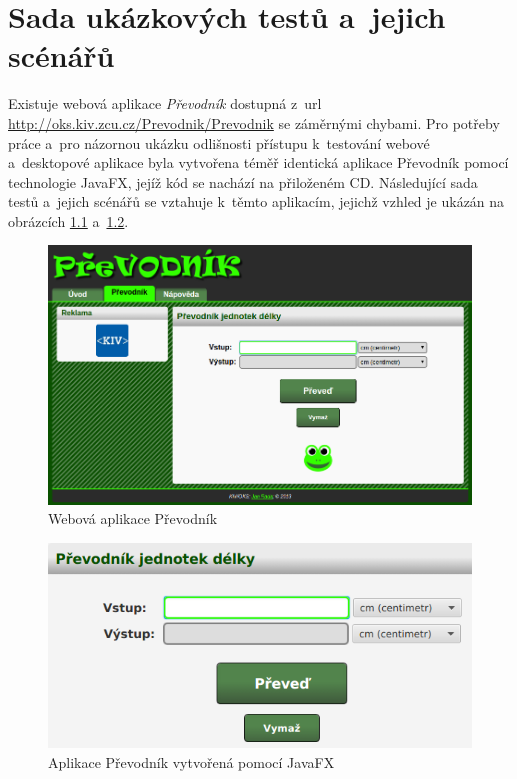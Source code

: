 \chapter{Sada ukázkových testů a~jejich scénářů}
Existuje webová aplikace \emph{Převodník} dostupná z~url \url{http://oks.kiv.zcu.cz/Prevodnik/Prevodnik} se záměrnými chybami. Pro potřeby práce a~pro názornou ukázku odlišnosti přístupu k~testování webové a~desktopové aplikace byla vytvořena téměř identická aplikace Převodník pomocí technologie JavaFX, jejíž kód se nachází na přiloženém CD. Následující sada testů a~jejich scénářů se vztahuje k~těmto aplikacím, jejichž vzhled je ukázán na obrázcích \ref{PrevodnikWeb} a~\ref{PrevodnikJavaFX}.

	\begin{figure}[ht!]
		\centering
		\caption{Webová aplikace Převodník}
		\label{PrevodnikWeb}
		\includegraphics[width=13.5cm]{img/PrevodnikWeb.png}
	\end{figure}
	\begin{figure}[ht!]
		\centering
		\caption{Aplikace Převodník vytvořená pomocí JavaFX}
		\label{PrevodnikJavaFX}
		\includegraphics[width=13.5cm]{img/PrevodnikJavaFX.png}
	\end{figure}

